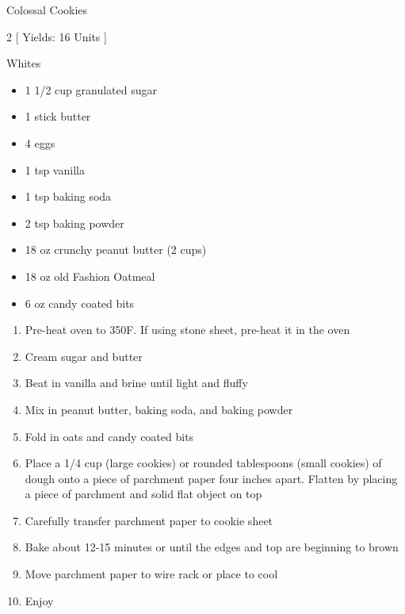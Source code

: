 \begin{Large}
    Colossal Cookies
\end{Large}

\begin{scriptsize}
\begin{multicols}{2}
[
\vspace{1em}
Yields: 16 Units
\vspace{-1.5em}
]

Whites
\begin{itemize}
    \item 1 1/2 cup granulated sugar
    \item 1 stick butter
    \item 4 eggs
    \item 1 tsp vanilla
    \item 1 tsp baking soda
    \item 2 tsp baking powder
    \item 18 oz crunchy peanut butter (2 cups)
    \item 18 oz old Fashion Oatmeal
    \item 6 oz candy coated bits
\end{itemize}
\end{multicols}
\end{scriptsize}

\begin{footnotesize}
\begin{enumerate}
    \item Pre-heat oven to 350\degree F. If using stone sheet, pre-heat it in the oven
    \item Cream sugar and butter 
    \item Beat in vanilla and brine until light and fluffy
    \item Mix in peanut butter, baking soda, and baking powder
    \item Fold in oats and candy coated bits
    \item Place a 1/4 cup (large cookies) or rounded tablespoons (small cookies) of dough onto a piece of parchment paper four inches apart. Flatten by placing a piece of parchment and solid flat object on top 
    \item Carefully transfer parchment paper to cookie sheet
    \item Bake about 12-15 minutes or until the edges and top are beginning to brown
    \item Move parchment paper to wire rack or place to cool
    \item Enjoy
\end{enumerate}
\end{footnotesize}

\vspace{2em}
